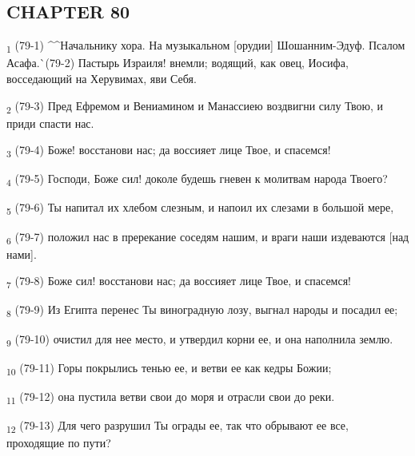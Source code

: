 \subsection{CHAPTER 80}
\begin{tcolorbox}
\textsubscript{1} (79-1) ^^Начальнику хора. На музыкальном [орудии] Шошанним-Эдуф. Псалом Асафа.^^ (79-2) Пастырь Израиля! внемли; водящий, как овец, Иосифа, восседающий на Херувимах, яви Себя.
\end{tcolorbox}
\begin{tcolorbox}
\textsubscript{2} (79-3) Пред Ефремом и Вениамином и Манассиею воздвигни силу Твою, и приди спасти нас.
\end{tcolorbox}
\begin{tcolorbox}
\textsubscript{3} (79-4) Боже! восстанови нас; да воссияет лице Твое, и спасемся!
\end{tcolorbox}
\begin{tcolorbox}
\textsubscript{4} (79-5) Господи, Боже сил! доколе будешь гневен к молитвам народа Твоего?
\end{tcolorbox}
\begin{tcolorbox}
\textsubscript{5} (79-6) Ты напитал их хлебом слезным, и напоил их слезами в большой мере,
\end{tcolorbox}
\begin{tcolorbox}
\textsubscript{6} (79-7) положил нас в пререкание соседям нашим, и враги наши издеваются [над нами].
\end{tcolorbox}
\begin{tcolorbox}
\textsubscript{7} (79-8) Боже сил! восстанови нас; да воссияет лице Твое, и спасемся!
\end{tcolorbox}
\begin{tcolorbox}
\textsubscript{8} (79-9) Из Египта перенес Ты виноградную лозу, выгнал народы и посадил ее;
\end{tcolorbox}
\begin{tcolorbox}
\textsubscript{9} (79-10) очистил для нее место, и утвердил корни ее, и она наполнила землю.
\end{tcolorbox}
\begin{tcolorbox}
\textsubscript{10} (79-11) Горы покрылись тенью ее, и ветви ее как кедры Божии;
\end{tcolorbox}
\begin{tcolorbox}
\textsubscript{11} (79-12) она пустила ветви свои до моря и отрасли свои до реки.
\end{tcolorbox}
\begin{tcolorbox}
\textsubscript{12} (79-13) Для чего разрушил Ты ограды ее, так что обрывают ее все, проходящие по пути?
\end{tcolorbox}
